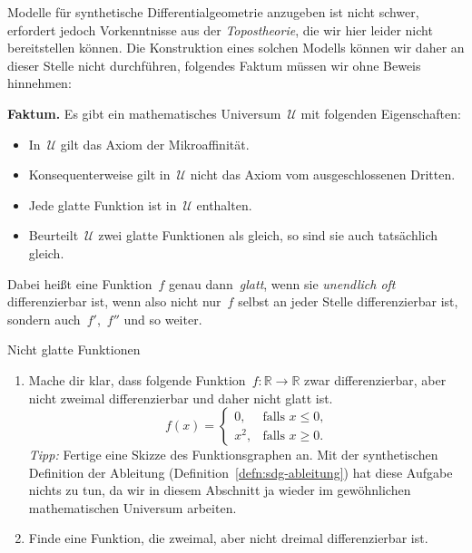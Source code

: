 \documentclass[twoside]{../zirkelblatt}
\newcommand{\RR}{\mathbb{R}}
\newcommand{\U}{\mathcal{U}}
\theoremstyle{definition}
\theoremstyle{plain}
\theoremstyle{remark}
\begin{document}
Modelle für synthetische Differentialgeometrie anzugeben ist nicht schwer,
erfordert jedoch Vorkenntnisse aus der \emph{Topostheorie}, die
wir hier leider nicht bereitstellen können. Die Konstruktion eines solchen Modells
können wir daher an dieser Stelle nicht durchführen, folgendes Faktum müssen wir
ohne Beweis hinnehmen:

\begin{shaded}
\textbf{Faktum.} Es gibt ein mathematisches Universum~$\U$ mit folgenden
Eigenschaften:
\begin{itemize}
\item In~$\U$ gilt das Axiom der Mikroaffinität.
\item Konsequenterweise gilt in~$\U$ nicht das Axiom vom ausgeschlossenen
Dritten.
\item Jede glatte Funktion ist in~$\U$ enthalten.
\item Beurteilt~$\U$ zwei glatte Funktionen als gleich, so sind sie
auch tatsächlich gleich.
\label{fact:sdg-universum}
\end{itemize}
\end{shaded}


Dabei heißt eine Funktion~$f$ genau dann~\emph{glatt}, wenn sie \emph{unendlich
oft} differenzierbar ist, wenn also nicht nur~$f$ selbst an jeder Stelle
differenzierbar ist, sondern auch~$f'$,~$f''$ und so weiter.

\begin{aufgabeShaded}{Nicht glatte Funktionen}
\begin{enumerate}
\item Mache dir klar, dass folgende Funktion~$f : \RR \to \RR$ zwar differenzierbar,
aber nicht zweimal differenzierbar und daher nicht glatt ist.
\[ f(x) = \begin{cases}
  0, & \text{falls~$x \leq 0$,} \\
  x^2, & \text{falls~$x \geq 0$.}
\end{cases} \]
\emph{Tipp:} Fertige eine Skizze des Funktionsgraphen an. Mit der synthetischen
Definition der Ableitung (Definition~\ref{defn:sdg-ableitung}) hat diese
Aufgabe nichts zu tun, da wir in diesem Abschnitt ja wieder im gewöhnlichen
mathematischen Universum arbeiten.
\item Finde eine Funktion, die zweimal, aber nicht dreimal differenzierbar ist.
\end{enumerate}
\end{aufgabeShaded}
\end{document}
